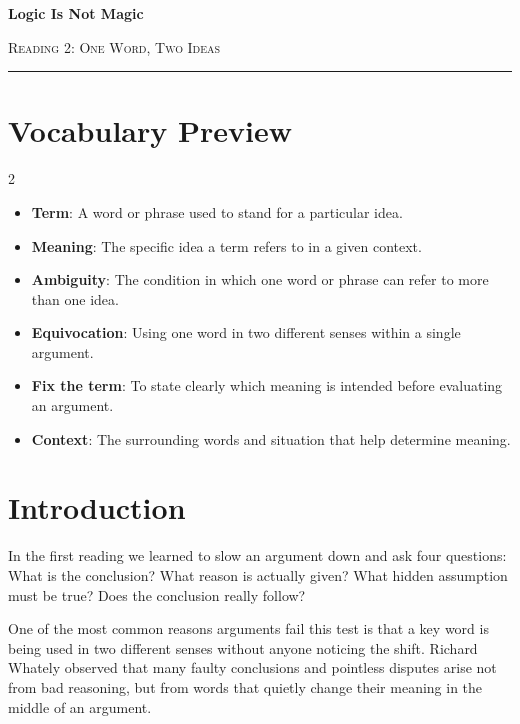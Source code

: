 \documentclass[12pt]{article}
\begin{document}
\begin{center}
{\LARGE\bfseries Logic Is Not Magic}\par\vspace{0.15em}
{\large\scshape Reading 2: One Word, Two Ideas}\par\vspace{0.45em}
\rule{0.82\textwidth}{0.4pt}\par\vspace{0.6em}
\end{center}

\section*{Vocabulary Preview}
\begin{multicols}{2}
\begin{itemize}[leftmargin=*, itemsep=0.18em]
\item \textbf{Term}: A word or phrase used to stand for a particular idea.
\item \textbf{Meaning}: The specific idea a term refers to in a given context.
\item \textbf{Ambiguity}: The condition in which one word or phrase can refer to more than one idea.
\item \textbf{Equivocation}: Using one word in two different senses within a single argument.
\item \textbf{Fix the term}: To state clearly which meaning is intended before evaluating an argument.
\item \textbf{Context}: The surrounding words and situation that help determine meaning.
\end{itemize}
\end{multicols}

\section*{Introduction}
In the first reading we learned to slow an argument down and ask four questions: What is the conclusion? What reason is actually given? What hidden assumption must be true? Does the conclusion really follow?

One of the most common reasons arguments fail this test is that a key word is being used in two different senses without anyone noticing the shift. Richard Whately observed that many faulty conclusions and pointless disputes arise not from bad reasoning, but from words that quietly change their meaning in the middle of an argument.
\end{document}
